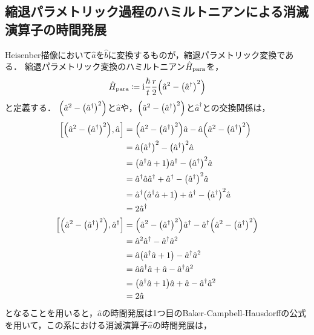 \documentclass{report}
\begin{document}
  \subsection{縮退パラメトリック過程のハミルトニアンによる消滅演算子の時間発展}
    Heisenber描像において$\hat{a}$を$\hat{b}$に変換するものが，縮退パラメトリック変換である．
    縮退パラメトリック変換のハミルトニアン$\hat{H}_{\mathrm{para}}$を，
    \begin{align}
      \hat{H}_{\mathrm{para}} \coloneqq \mathrm{i}\frac{\hbar}{t}\frac{r}{2}\qty(\hat{a}^2 - \qty(\hat{a}^{\dag})^2)
    \end{align}
    と定義する．
    $\qty(\hat{a}^2 - \qty(\hat{a}^{\dag})^2)$と$\hat{a}$や，$\qty(\hat{a}^2 - \qty(\hat{a}^{\dag})^2)$と$\hat{a}^{\dag}$との交換関係は，
    \begin{align}
      \qty[\qty(\hat{a}^2 - \qty(\hat{a}^{\dag})^2), \hat{a}] &= \qty(\hat{a}^2 - \qty(\hat{a}^{\dag})^2)\hat{a} - \hat{a}\qty(\hat{a}^2 - \qty(\hat{a}^{\dag})^2) \\ 
      &= \hat{a}\qty(\hat{a}^{\dag})^2 - \qty(\hat{a}^{\dag})^2\hat{a} \\ 
      &= \qty(\hat{a}^{\dag}\hat{a} + 1)\hat{a}^{\dag} - \qty(\hat{a}^{\dag})^2\hat{a} \\ 
      &= \hat{a}^{\dag}\hat{a}\hat{a}^{\dag} + \hat{a}^{\dag} - \qty(\hat{a}^{\dag})^2\hat{a} \\ 
      &= \hat{a}^{\dag}\qty(\hat{a}^{\dag}\hat{a} + 1) + \hat{a}^{\dag} - \qty(\hat{a}^{\dag})^2\hat{a} \\ 
      &= 2\hat{a}^{\dag} \\ 
      \qty[\qty(\hat{a}^2 - \qty(\hat{a}^{\dag})^2), \hat{a}^{\dag}] &= \qty(\hat{a}^2 - \qty(\hat{a}^{\dag})^2)\hat{a}^{\dag} - \hat{a}^{\dag}\qty(\hat{a}^2 - \qty(\hat{a}^{\dag})^2) \\ 
      &= \hat{a}^2\hat{a}^{\dag} - \hat{a}^{\dag}\hat{a}^2 \\ 
      &= \hat{a}\qty(\hat{a}^{\dag}\hat{a} + 1) - \hat{a}^{\dag}\hat{a}^2 \\ 
      &= \hat{a}\hat{a}^{\dag}\hat{a} + \hat{a} - \hat{a}^{\dag}\hat{a}^2 \\ 
      &= \qty(\hat{a}^{\dag}\hat{a} + 1)\hat{a} + \hat{a} - \hat{a}^{\dag}\hat{a}^2 \\ 
      &= 2\hat{a}
    \end{align}
    となることを用いると，$\hat{a}$の時間発展は1つ目のBaker-Campbell-Hausdorffの公式を用いて，この系における消滅演算子$\hat{a}$の時間発展は，
\end{document}

